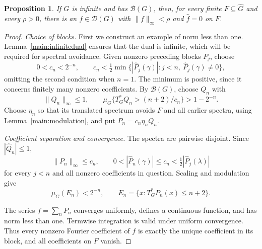 \documentclass[11pt]{amsart}
\newtheorem{proposition}[theorem]{Proposition}
\theoremstyle{definition}
\theoremstyle{remark}
\newcommand{\B}{\mathcal B}
\newcommand{\D}{\mathcal D}
\begin{document}
\begin{proposition}\label{main:gluing}
If \(G\) is infinite and has \(\B(G)\), then, for every finite
\(F\subseteq\widehat G\) and every \(\rho>0\), there is an
\(f\in\D(G)\) with \(\|f\|_\infty<\rho\) and
\(\widehat f=0\) on \(F\).
\end{proposition}

\begin{proof}
\emph{Choice of blocks.}
First we construct an example of norm less than one.
Lemma~\ref{main:infinitedual} ensures that the dual is infinite,
which will be required for spectral avoidance.
Given nonzero preceding blocks \(P_j\), choose
\[
 0<c_n<2^{-n},\qquad
 c_n<\tfrac12\min\{|\widehat P_j(\gamma)|:
                    j<n,\ \widehat P_j(\gamma)\ne0\},
\]
omitting the second condition when \(n=1\).
The minimum is positive, since it concerns finitely many nonzero
coefficients. By \(\B(G)\), choose \(Q_n\) with
\[
 \|Q_n\|_\infty\leq1,\qquad
 \mu_G\{T^*_GQ_n>(n+2)/c_n\}>1-2^{-n}.
\]
 Choose \(\eta_n\) so that its translated spectrum
avoids \(F\) and all earlier spectra, using
Lemma~\ref{main:modulation}, and put \(P_n=c_n\eta_nQ_n\).

\emph{Coefficient separation and convergence.}
The spectra are pairwise disjoint. Since \(|\widehat Q_n|\leq1\),
\begin{equation}\label{main:bands}
 \|P_n\|_\infty\leq c_n,\qquad
 0<|\widehat P_n(\gamma)|\leq c_n
       <\tfrac12|\widehat P_j(\lambda)|
\end{equation}
for every \(j<n\) and all nonzero coefficients in question.
Scaling and modulation give
\[
 \mu_G(E_n)<2^{-n},\qquad E_n=\{x:T^*_GP_n(x)\leq n+2\}.
\]

The series \(f=\sum_nP_n\) converges uniformly, defines a continuous
function, and has norm less than one. Termwise integration is
valid under uniform convergence. Thus every nonzero Fourier
coefficient of \(f\) is exactly the unique coefficient in its
block, and all coefficients on \(F\) vanish.


\end{proof}
\end{document}
